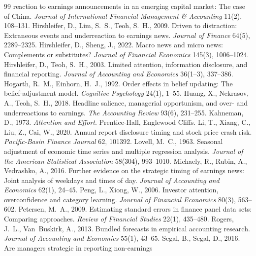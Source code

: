 \documentclass[11pt]{article}
\begin{document}
\begin{thebibliography}{99}
reaction to earnings announcements in an emerging capital market: The case of China. \emph{Journal of International
Financial Management \& Accounting} 11(2), 108--131.
 Hirshleifer, D., Lim, S.~S., Teoh, S.~H., 2009. Driven to
distraction: Extraneous events and underreaction to earnings news. \emph{Journal of Finance} 64(5), 2289--2325.
 Hirshleifer, D., Sheng, J., 2022. Macro news and micro news:
Complements or substitutes? \emph{Journal of Financial Economics} 145(3), 1006--1024.
 Hirshleifer, D., Teoh, S.~H., 2003. Limited attention,
information disclosure, and financial reporting. \emph{Journal of Accounting and Economics} 36(1--3), 337--386.
 Hogarth, R.~M., Einhorn, H.~J., 1992. Order effects in belief
updating: The belief-adjustment model. \emph{Cognitive Psychology} 24(1), 1--55.
 Huang, X., Nekrasov, A., Teoh, S.~H., 2018. Headline salience, managerial
opportunism, and over- and underreactions to earnings. \emph{The Accounting Review} 93(6), 231--255.
 Kahneman, D., 1973. \emph{Attention and Effort}. Prentice-Hall, Englewood Cliffs.
 Li, T., Xiang, C., Liu, Z., Cai, W., 2020. Annual report disclosure timing and stock
price crash risk. \emph{Pacific-Basin Finance Journal} 62, 101392.
 Lovell, M.~C., 1963. Seasonal adjustment of economic time series and multiple
regression analysis. \emph{Journal of the American Statistical Association} 58(304), 993--1010.
 Michaely, R., Rubin, A., Vedrashko, A., 2016. Further evidence on the
strategic timing of earnings news: Joint analysis of weekdays and times of day. \emph{Journal of Accounting and
Economics} 62(1), 24--45.
 Peng, L., Xiong, W., 2006. Investor attention, overconfidence and category
learning. \emph{Journal of Financial Economics} 80(3), 563--602.
 Petersen, M.~A., 2009. Estimating standard errors in finance panel data sets:
Comparing approaches. \emph{Review of Financial Studies} 22(1), 435--480.
 Rogers, J.~L., Van~Buskirk, A., 2013. Bundled forecasts in empirical
accounting research. \emph{Journal of Accounting and Economics} 55(1), 43--65.
 Segal, B., Segal, D., 2016. Are managers strategic in reporting non-earnings

\end{thebibliography}
\end{document}
